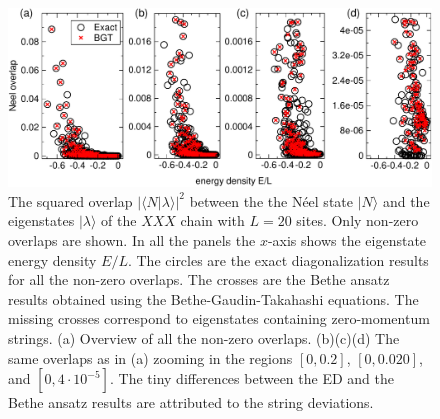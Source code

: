 \documentclass[11pt]{iopart}
\begin{document}
\begin{figure}[t]
\begin{center}
\includegraphics[width=.9\textwidth]{./draft_figs/L20_BT_check}
\end{center}
\caption{ The squared overlap $|\langle N|\lambda\rangle|^2$ between the the 
 N\'eel state $|N\rangle$ and the eigenstates $|\lambda\rangle$ of the $XXX$ 
 chain with $L=20$ sites. Only non-zero overlaps are shown. In all the panels the 
 $x$-axis shows the eigenstate energy density $E/L$. The circles are the exact 
 diagonalization results for all the non-zero overlaps. The crosses are the Bethe 
 ansatz results obtained using the Bethe-Gaudin-Takahashi equations. The missing 
 crosses correspond to eigenstates containing zero-momentum strings. (a) Overview 
 of all the non-zero overlaps. (b)(c)(d) The same overlaps as in (a) zooming in 
 the regions $[0,0.2]$, $[0,0.020]$, and $[0,4\cdot 10^{-5}]$. The tiny differences 
 between the ED and the Bethe ansatz results are attributed to the string 
 deviations. 
}
\label{fig1-BGT-check}
\end{figure}
\end{document}
